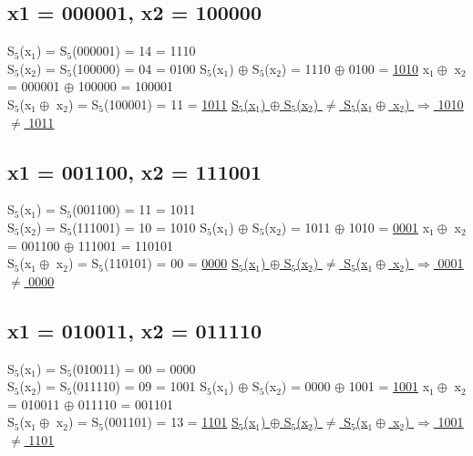 \subsection{x1 = 000001, x2 = 100000}
\label{section:4a}
S$_{5}$(x$_{1}$) = S$_{5}$(000001) = 14 = 1110 \\
S$_{5}$(x$_{2}$) = S$_{5}$(100000) = 04 = 0100 
\vspace{0.5em}\newline
S$_{5}$(x$_{1}$) $\oplus$ S$_{5}$(x$_{2}$) = 1110 $\oplus$ 0100 = \underline{1010}
\vspace{1em}\newline
x$_{1} \oplus$ x$_{2}$ = 000001 $\oplus$ 100000 = 100001 \\
S$_{5}$(x$_{1} \oplus$ x$_{2}$) = S$_{5}$(100001) = 11 = \underline{1011}
\vspace{1em}\newline
\underline{\underline{S$_{5}$(x$_{1}$) $\oplus$ S$_{5}$(x$_{2}$) $\neq$ S$_{5}$(x$_{1} \oplus$ x$_{2}$) $\Rightarrow$ 1010  $\neq$ 1011}}

\subsection{x1 = 001100, x2 = 111001}
\label{section:4b}
S$_{5}$(x$_{1}$) = S$_{5}$(001100) = 11 = 1011 \\
S$_{5}$(x$_{2}$) = S$_{5}$(111001) = 10 = 1010 
\vspace{0.5em}\newline
S$_{5}$(x$_{1}$) $\oplus$ S$_{5}$(x$_{2}$) = 1011 $\oplus$ 1010 = \underline{0001}
\vspace{1em}\newline
x$_{1} \oplus$ x$_{2}$ = 001100 $\oplus$ 111001  = 110101 \\
S$_{5}$(x$_{1} \oplus$ x$_{2}$) = S$_{5}$(110101) = 00 = \underline{0000}
\vspace{1em}\newline
\underline{\underline{S$_{5}$(x$_{1}$) $\oplus$ S$_{5}$(x$_{2}$) $\neq$ S$_{5}$(x$_{1} \oplus$ x$_{2}$) $\Rightarrow$ 0001  $\neq$ 0000}}

\subsection{x1 = 010011, x2 = 011110}
\label{section:4c}
S$_{5}$(x$_{1}$) = S$_{5}$(010011) = 00 = 0000 \\
S$_{5}$(x$_{2}$) = S$_{5}$(011110) = 09 = 1001 
\vspace{0.5em}\newline
S$_{5}$(x$_{1}$) $\oplus$ S$_{5}$(x$_{2}$) = 0000 $\oplus$ 1001 = \underline{1001}
\vspace{1em}\newline
x$_{1} \oplus$ x$_{2}$ = 010011 $\oplus$ 011110  = 001101 \\
S$_{5}$(x$_{1} \oplus$ x$_{2}$) = S$_{5}$(001101) = 13 = \underline{1101}
\vspace{1em}\newline
\underline{\underline{S$_{5}$(x$_{1}$) $\oplus$ S$_{5}$(x$_{2}$) $\neq$ S$_{5}$(x$_{1} \oplus$ x$_{2}$) $\Rightarrow$ 1001  $\neq$ 1101}}

